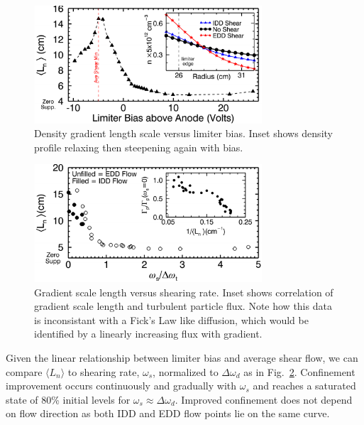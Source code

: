 \documentclass[aps,prl,amsmath,amssymb,preprint,superscriptaddress]{revtex4}
\begin{document}
\begin{figure}
\begin{center}
\includegraphics[width=8.5cm]{densgrad.pdf}%
\caption{\label{fig:densgrad} Density gradient length scale versus limiter bias. Inset shows density profile relaxing then steepening again with bias.}
\end{center}
\end{figure}

\begin{figure}
\begin{center}
\includegraphics[width=8.5cm]{shearandgrad.pdf}%
\caption{\label{fig:shearandgrad} Gradient scale length versus shearing rate. Inset shows correlation of gradient scale length and turbulent particle flux. Note how this data is inconsistant with a Fick's Law like diffusion, which would be identified by a linearly increasing flux with gradient.}
\end{center}
\end{figure}

Given the linear relationship between limiter bias and average shear flow, we can compare $\langle L_{n} \rangle$ to shearing rate, $\omega_{s}$, normalized to $\Delta \omega_{d}$ as in Fig.~\ref{fig:shearandgrad}. Confinement improvement occurs continuously and gradually with $\omega_{s}$ and reaches a saturated state of 80\% initial levels for $\omega_{s} \approx \Delta \omega_{d}$. Improved confinement does not depend on flow direction as both IDD and EDD flow points lie on the same curve.
\end{document}
